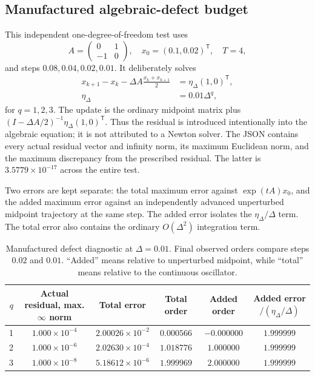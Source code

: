 \subsection{Manufactured algebraic-defect budget}
\label{sx:framework-defect}
This independent one-degree-of-freedom test uses
\begin{equation}
 A=\begin{pmatrix}0&1\\-1&0\end{pmatrix},\quad
 x_0=(0.1,0.02)^{\mathsf T},\quad T=4,
 \label{sx:defect-model}
\end{equation}
and steps $0.08,0.04,0.02,0.01$. It deliberately solves
\begin{equation}
 \begin{aligned}
 x_{k+1}-x_k-\Delta A\frac{x_k+x_{k+1}}2
   &=\eta_\Delta(1,0)^{\mathsf T},\\
 \eta_\Delta&=0.01\Delta^q,
 \end{aligned}
 \label{sx:defect-injection}
\end{equation}
for $q=1,2,3$. The update is the ordinary midpoint matrix plus
$(I-\Delta A/2)^{-1}\eta_\Delta(1,0)^{\mathsf T}$.
Thus the residual is introduced intentionally into the algebraic equation;
it is not attributed to a Newton solver. The JSON contains every actual
residual vector and infinity norm, its maximum Euclidean norm, and the
maximum discrepancy from the prescribed residual. The latter is
$3.5779\times10^{-17}$ across the entire test.

Two errors are kept separate: the total maximum error against
$\exp(tA)x_0$, and the added maximum error against an independently
advanced unperturbed midpoint trajectory at the same step. The added
error isolates the $\eta_\Delta/\Delta$ term. The total error also
contains the ordinary $O(\Delta^2)$ integration term.

\begin{table}[t]
\centering
\caption{Manufactured defect diagnostic at $\Delta=0.01$. Final observed orders compare steps $0.02$ and $0.01$. ``Added'' means relative to unperturbed midpoint, while ``total'' means relative to the continuous oscillator.}
\label{sx:defect-table}
\begin{tabular}{rccccc}
\toprule
$q$ & Actual residual, max. $\infty$ norm & Total error & Total order & Added order & Added error$/ (\eta_\Delta/\Delta)$\\
\midrule
1 & $1.000\times10^{-4}$ & $2.00026\times10^{-2}$ & $0.000566$ & $-0.000000$ & $1.999999$ \\
2 & $1.000\times10^{-6}$ & $2.02630\times10^{-4}$ & $1.018776$ & $1.000000$ & $1.999999$ \\
3 & $1.000\times10^{-8}$ & $5.18612\times10^{-6}$ & $1.999969$ & $2.000000$ & $1.999999$ \\
\bottomrule
\end{tabular}
\end{table}

